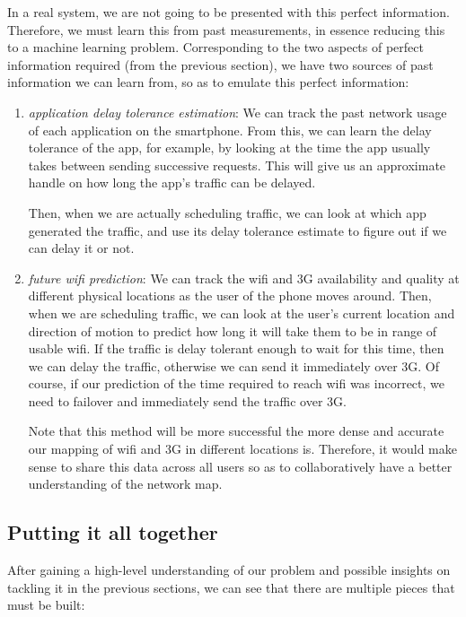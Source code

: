 \documentclass[12pt, fleqn]{article}
\begin{document}
In a real system, we are not going to be presented with this perfect 
information. Therefore, we must learn this from past measurements, in essence 
reducing this to a machine learning problem. Corresponding to the two aspects of 
perfect information required (from the previous section), we have two sources of 
past information we can learn from, so as to emulate this perfect information:
\begin{enumerate}
     \item \emph{application delay tolerance estimation}: We can
     track the past network usage of each application on the smartphone. From 
     this, we can learn the delay tolerance of the app, for example, by looking
     at the time the app usually takes between sending successive requests. This 
     will give us an approximate handle on how long the app's traffic can be 
     delayed.
     
     Then, when we are actually scheduling traffic, we can look at which app 
     generated the traffic, and use its delay tolerance estimate to figure out 
     if we can delay it or not.
     
    \item \emph{future wifi prediction}: We can track the wifi and 3G 
    availability and quality at different physical locations as the user of the phone moves 
    around. Then, when we are scheduling 
    traffic, we can look at the user's current location and direction of motion 
    to predict how long it will take them to be in range of usable wifi. If the 
    traffic is delay tolerant enough to wait for this time, then we can delay 
    the traffic, otherwise we can send it immediately over 3G. Of course, if our 
    prediction of the time required to reach wifi was incorrect, we need to 
    failover and immediately send the traffic over 3G. 
    
    Note that this method will be more successful the more dense and accurate 
    our mapping of wifi and 3G in different locations is. Therefore, it would 
    make sense to share this data across all users so as to collaboratively have 
    a better understanding of the network map.
\end{enumerate}

\subsection{Putting it all together}

After gaining a high-level understanding of our problem and possible insights on 
tackling it in the previous sections, we can see that there are multiple pieces that 
must be built:
\end{document}
